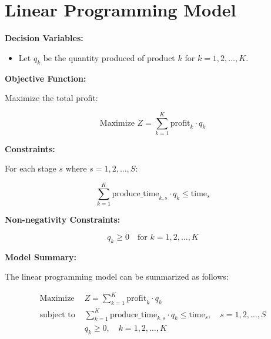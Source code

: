 \documentclass{article}
\begin{document}
\section*{Linear Programming Model}

\textbf{Decision Variables:}
\begin{itemize}
    \item Let \( q_k \) be the quantity produced of product \( k \) for \( k = 1, 2, \ldots, K \).
\end{itemize}

\textbf{Objective Function:}

Maximize the total profit:

\[
\text{Maximize } Z = \sum_{k=1}^{K} \text{profit}_k \cdot q_k
\]

\textbf{Constraints:}

For each stage \( s \) where \( s = 1, 2, \ldots, S \):

\[
\sum_{k=1}^{K} \text{produce\_time}_{k,s} \cdot q_k \leq \text{time}_s
\]

\textbf{Non-negativity Constraints:}

\[
q_k \geq 0 \quad \text{for } k = 1, 2, \ldots, K
\]

\textbf{Model Summary:}

The linear programming model can be summarized as follows:

\begin{align*}
\text{Maximize } & Z = \sum_{k=1}^{K} \text{profit}_k \cdot q_k \\
\text{subject to } & \sum_{k=1}^{K} \text{produce\_time}_{k,s} \cdot q_k \leq \text{time}_s, \quad s = 1, 2, \ldots, S \\
& q_k \geq 0, \quad k = 1, 2, \ldots, K
\end{align*}
\end{document}
